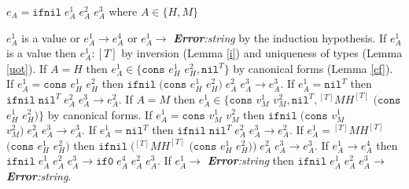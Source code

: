 \begin{case}
$e_{A}=\mathtt{ifnil}\;e_{A}^{1}\;e_{A}^{2}\;e_{A}^{3}$ where $A\in\lbrace H,M\rbrace$

$e_{A}^{1}$ is a value or $e_{A}^{1}\rightarrow e_{A}^{4}$ or $e_{A}^{1}\rightarrow$ \emph{\textbf{Error}:\;string} by the induction hypothesis.  If $e_{A}^{1}$ is a value then $e_{A}^{1}:[T]$ by inversion (Lemma \ref{i}) and uniqueness of types (Lemma \ref{uot}).  If $A=H$ then $e_{A}^{1}\in\lbrace\mathtt{cons}$ $e_{H}^{1}$ $e_{H}^{2},\mathtt{nil}^{T}\rbrace$ by canonical forms (Lemma \ref{cf}).  If $e_{A}^{1}=\mathtt{cons}$ $e_{H}^{1}$ $e_{H}^{2}$ then $\mathtt{ifnil}\;(\mathtt{cons}$ $e_{H}^{1}$ $e_{H}^{2})\;e_{A}^{2}\;e_{A}^{3}\rightarrow e_{A}^{3}$.  If $e_{A}^{1}=\mathtt{nil}^{T}$ then $\mathtt{ifnil}\;\mathtt{nil}^{T}\;e_{A}^{2}\;e_{A}^{3}\rightarrow e_{A}^{2}$.  If $A=M$ then $e_{A}^{1}\in\lbrace\mathtt{cons}$ $v_{M}^{1}$ $v_{M}^{2},\mathtt{nil}^{T},{^{[T]}M}H^{[T]}$ $(\mathtt{cons}$ $e_{H}^{1}$ $e_{H}^{2})\rbrace$ by canonical forms.  If $e_{A}^{1}=\mathtt{cons}$ $v_{M}^{1}$ $v_{M}^{2}$ then $\mathtt{ifnil}\;(\mathtt{cons}$ $v_{M}^{1}$ $v_{M}^{2})\;e_{A}^{2}\;e_{A}^{3}\rightarrow e_{A}^{3}$.  If $e_{A}^{1}=\mathtt{nil}^{T}$ then $\mathtt{ifnil}\;\mathtt{nil}^{T}\;e_{A}^{2}\;e_{A}^{3}\rightarrow e_{A}^{2}$.  If $e_{A}^{1}={^{[T]}M}H^{[T]}$ $(\mathtt{cons}$ $e_{H}^{1}$ $e_{H}^{2})$ then $\mathtt{ifnil}\;({^{[T]}M}H^{[T]}$ $(\mathtt{cons}$ $e_{H}^{1}$ $e_{H}^{2}))\;e_{A}^{2}\;e_{A}^{3}\rightarrow e_{A}^{3}$.  If $e_{A}^{1}\rightarrow e_{A}^{4}$ then $\mathtt{ifnil}\;e_{A}^{1}\;e_{A}^{2}\;e_{A}^{3}\rightarrow \mathtt{if0}\;e_{A}^{4}\;e_{A}^{2}\;e_{A}^{3}$.  If $e_{A}^{1}\rightarrow$ \emph{\textbf{Error}:\;string} then $\mathtt{ifnil}\;e_{A}^{1}\;e_{A}^{2}\;e_{A}^{3}\rightarrow$ \emph{\textbf{Error}:\;string}.
\end{case}